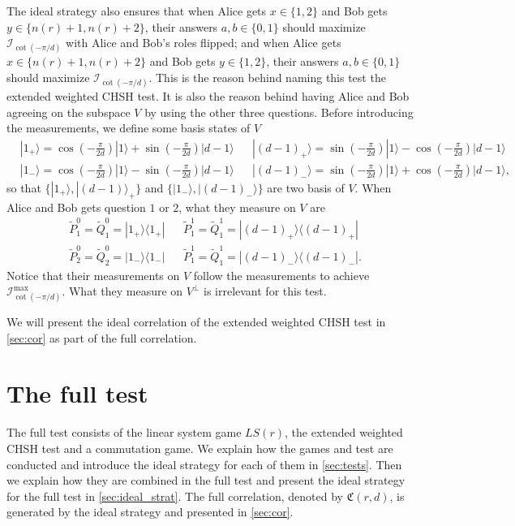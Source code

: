 \documentclass[11pt,letterpaper]{article}
\newcommand{\ket}[1]{|#1\rangle}
\newcommand{\ketbra}[2]{|#1\rangle\langle#2|}
\newcommand{\1}{\mathbb{1}}
\newcommand{\LS}{LS}
\newcommand{\tP}{\tilde{P}}
\newcommand{\tQ}{\tilde{Q}}
\newcommand{\nr}{n(r)}
\newcommand{\fC}{\mathfrak{C}}
\newcommand{\I}{\mathcal{I}}
\theoremstyle{definition}
\begin{document}
The ideal strategy also ensures that 
when Alice gets $x \in \{1,2\}$ and Bob gets $y \in \{\nr+1, \nr+2\}$, 
their answers $a,b \in \{0,1\}$ should maximize $\I_{\cot(-\pi/d)}$ with Alice and Bob's roles flipped;
and when Alice gets $x \in \{\nr+1,\nr+2\}$ and Bob gets $y \in \{1, 2\}$,
their answers $a,b \in \{0,1\}$ should maximize $\I_{\cot(-\pi/d)}$.
This is the reason behind naming this test the extended weighted CHSH test.
It is also the reason behind having Alice and Bob agreeing on the subspace $V$ 
by using the other three questions.
Before introducing the measurements, 
we define some basis states of $V$
\begin{align*}
	&\ket{1_+} = \cos(-\frac{\pi}{2d})\ket{1} + \sin(-\frac{\pi}{2d})\ket{d-1}
	&&\ket{(d-1)_+} = \sin(-\frac{\pi}{2d})\ket{1} - \cos(-\frac{\pi}{2d})\ket{d-1}\\
	&\ket{1_-} = \cos(-\frac{\pi}{2d})\ket{1} - \sin(-\frac{\pi}{2d})\ket{d-1}
	&&\ket{(d-1)_-} = \sin(-\frac{\pi}{2d})\ket{1} + \cos(-\frac{\pi}{2d})\ket{d-1},
\end{align*}
so that $\{\ket{1_+}, \ket{(d-1)}_+\}$ and $\{\ket{1_-}, \ket{(d-1)_-}\}$ are two basis
of $V$.
When Alice and Bob gets question $1$ or $2$, what they measure on $V$ are
\begin{align*}
	&\tP_1^0 = \tQ_1^0 =  \ketbra{1_+}{1_+} && \tP_1^1 = \tQ_1^1 =  \ketbra{(d-1)_+}{(d-1)_+}\\
	&\tP_2^0 = \tQ_2^0 =  \ketbra{1_-}{1_-} && \tP_1^1 = \tQ_1^1 =  \ketbra{(d-1)_-}{(d-1)_-}.
\end{align*}
Notice that their measurements on $V$ follow the measurements to achieve $\I_{\cot(-\pi/d)}^{\max}$.
What they measure on $V^\perp$ is irrelevant for this test. 


We will present the ideal correlation of the extended weighted CHSH test
in \cref{sec:cor} as part of the full correlation.

\section{The full test}
\label{sec:full_test}
The full test consists of the linear system game $\LS(r)$,
the extended weighted CHSH test and a commutation game. We explain how the games and test are conducted and
introduce the ideal strategy for each of them in \cref{sec:tests}. 
Then we explain how they are combined in the full test and present the ideal strategy for the full test in \cref{sec:ideal_strat}. The full correlation, denoted by $\fC(r,d)$, is generated by the ideal strategy and presented in \cref{sec:cor}.
\end{document}
